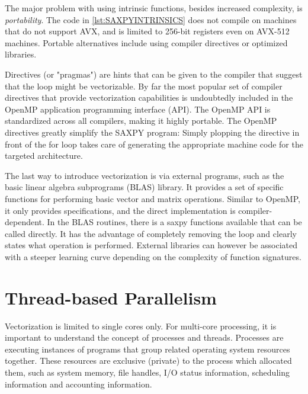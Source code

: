 The major problem with using intrinsic functions, besides increased complexity, is \emph{portability}. The code in \ref{lst:SAXPYINTRINSICS} does not compile on machines that do not support AVX, and is limited to 256-bit registers even on AVX-512 machines. Portable alternatives include using compiler directives or optimized libraries.

Directives (or "pragmas") are hints that can be given to the compiler that suggest that the loop might be vectorizable. By far the most popular set of compiler directives that provide vectorization capabilities is undoubtedly included in the OpenMP application programming interface (API). The OpenMP API is standardized across all compilers, making it highly portable. The OpenMP directives greatly simplify the SAXPY program:
\noindent Simply plopping the directive in front of the for loop takes care of generating the appropriate machine code for the targeted architecture. 

The last way to introduce vectorization is via external programs, such as the basic linear algebra subprograms (BLAS) library. It provides a set of specific functions for performing basic vector and matrix operations. Similar to OpenMP, it only provides specifications, and the direct implementation is compiler-dependent. In the BLAS routines, there is a saxpy functions available that can be called directly. It has the advantage of completely removing the loop and clearly states what operation is performed.
\noindent External libraries can however be associated with a steeper learning curve depending on the complexity of function signatures.

\section{Thread-based Parallelism}

Vectorization is limited to single cores only. For multi-core processing, it is important to understand the concept of processes and threads. Processes are executing instances of programs that group related operating system resources together. These resources are exclusive (private) to the process which allocated them, such as system memory, file handles, I/O status information, scheduling information and accounting information. 

